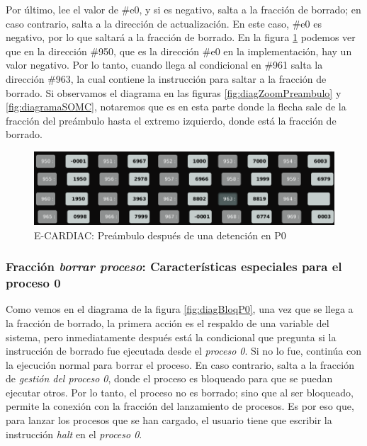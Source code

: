 \documentclass[letterpaper,12pt,oneside]{book}
\begin{document}
        Por último, lee el valor de \#e0, y si es negativo, salta a la fracción de borrado;
		en caso contrario, salta a la dirección de actualización. En este caso, \#e0 es negativo, por lo que saltará a la fracción de borrado. En
		la figura \ref{fig:eccPreamHaltP0} podemos ver que en la dirección \#950, que es la dirección \#e0 en la implementación,
		 hay un valor negativo. Por lo tanto, cuando llega
		al condicional en \#961 salta la dirección \#963, la cual contiene la instrucción para saltar a la fracción de borrado. Si observamos 
		el diagrama en las figuras \ref{fig:diagZoomPreambulo} y \ref{fig:diagramaSOMC}, notaremos que es en esta parte donde 
		la flecha sale de la fracción del preámbulo hasta el extremo izquierdo, donde está la fracción de borrado.

		
		\begin{figure}[h]		
			\centering
			\includegraphics[scale=0.4]{media/CARDIACC/eccPreambuloHaltOpP0.png}
			\caption{ E-CARDIAC: Preámbulo después de una detención en P0}
			\label{fig:eccPreamHaltP0}
		\end{figure}
		
		\subsubsection{Fracción \textit{borrar proceso}: Características especiales para el proceso 0}
		
		Como vemos en el diagrama de la figura \ref{fig:diagBloqP0}, una vez que se llega a la fracción de borrado, la primera acción
		es el respaldo de una variable del sistema, pero inmediatamente después está la condicional que pregunta si la instrucción
		de borrado fue ejecutada desde el \textit{proceso 0}. Si no lo fue, continúa con la ejecución normal para
		borrar el proceso. En caso contrario, salta a la fracción de \textit{gestión del proceso 0},
		donde el proceso es bloqueado para que se puedan ejecutar otros. Por lo tanto, el proceso no es borrado; 
		sino que al ser bloqueado, permite la conexión con la fracción del lanzamiento de procesos. Es por eso que, para lanzar los procesos que se han 
		cargado, el usuario tiene que escribir la instrucción \textit{halt} en el \textit{proceso 0}.
\end{document}
